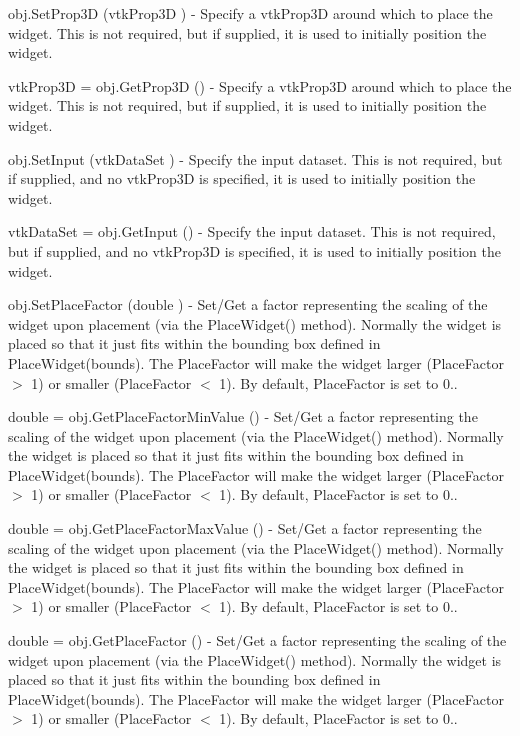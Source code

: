 \begin{DoxyItemize}
\item {\ttfamily obj.\-Set\-Prop3\-D (vtk\-Prop3\-D )} -\/ Specify a vtk\-Prop3\-D around which to place the widget. This is not required, but if supplied, it is used to initially position the widget.  
\item {\ttfamily vtk\-Prop3\-D = obj.\-Get\-Prop3\-D ()} -\/ Specify a vtk\-Prop3\-D around which to place the widget. This is not required, but if supplied, it is used to initially position the widget.  
\item {\ttfamily obj.\-Set\-Input (vtk\-Data\-Set )} -\/ Specify the input dataset. This is not required, but if supplied, and no vtk\-Prop3\-D is specified, it is used to initially position the widget.  
\item {\ttfamily vtk\-Data\-Set = obj.\-Get\-Input ()} -\/ Specify the input dataset. This is not required, but if supplied, and no vtk\-Prop3\-D is specified, it is used to initially position the widget.  
\item {\ttfamily obj.\-Set\-Place\-Factor (double )} -\/ Set/\-Get a factor representing the scaling of the widget upon placement (via the Place\-Widget() method). Normally the widget is placed so that it just fits within the bounding box defined in Place\-Widget(bounds). The Place\-Factor will make the widget larger (Place\-Factor $>$ 1) or smaller (Place\-Factor $<$ 1). By default, Place\-Factor is set to 0..  
\item {\ttfamily double = obj.\-Get\-Place\-Factor\-Min\-Value ()} -\/ Set/\-Get a factor representing the scaling of the widget upon placement (via the Place\-Widget() method). Normally the widget is placed so that it just fits within the bounding box defined in Place\-Widget(bounds). The Place\-Factor will make the widget larger (Place\-Factor $>$ 1) or smaller (Place\-Factor $<$ 1). By default, Place\-Factor is set to 0..  
\item {\ttfamily double = obj.\-Get\-Place\-Factor\-Max\-Value ()} -\/ Set/\-Get a factor representing the scaling of the widget upon placement (via the Place\-Widget() method). Normally the widget is placed so that it just fits within the bounding box defined in Place\-Widget(bounds). The Place\-Factor will make the widget larger (Place\-Factor $>$ 1) or smaller (Place\-Factor $<$ 1). By default, Place\-Factor is set to 0..  
\item {\ttfamily double = obj.\-Get\-Place\-Factor ()} -\/ Set/\-Get a factor representing the scaling of the widget upon placement (via the Place\-Widget() method). Normally the widget is placed so that it just fits within the bounding box defined in Place\-Widget(bounds). The Place\-Factor will make the widget larger (Place\-Factor $>$ 1) or smaller (Place\-Factor $<$ 1). By default, Place\-Factor is set to 0..  

\end{DoxyItemize}
